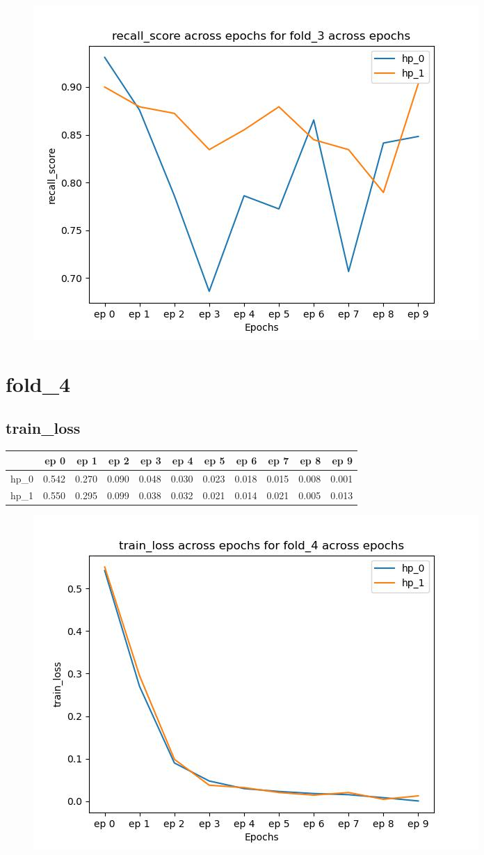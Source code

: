 \documentclass{article}
\begin{document}
\begin{figure}[H]
\includegraphics[scale = 0.75]{fold_3/recall_score}
\end{figure}
\section{fold\_4}
\subsection{train\_loss}
\begin{tabular}{lrrrrrrrrrr}
\toprule
{} &   ep 0 &   ep 1 &   ep 2 &   ep 3 &   ep 4 &   ep 5 &   ep 6 &   ep 7 &   ep 8 &   ep 9 \\
\midrule
hp\_0 &  0.542 &  0.270 &  0.090 &  0.048 &  0.030 &  0.023 &  0.018 &  0.015 &  0.008 &  0.001 \\
hp\_1 &  0.550 &  0.295 &  0.099 &  0.038 &  0.032 &  0.021 &  0.014 &  0.021 &  0.005 &  0.013 \\
\bottomrule
\end{tabular}

\begin{figure}[H]
\includegraphics[scale = 0.75]{fold_4/train_loss}
\end{figure}
\end{document}
